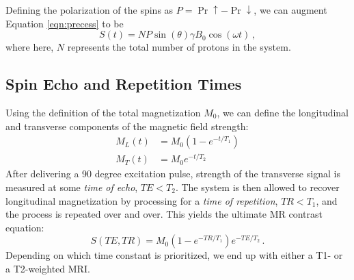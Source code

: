 Defining the polarization of the spins as $P = \Pr{\uparrow} - \Pr{\downarrow}$, we can augment Equation \ref{eqn:precess} to be
\begin{equation}
    S(t) = N P \sin{(\theta)} \gamma B_0\cos(\omega t) \,,
\end{equation}
where here, $N$ represents the total number of protons in the system.

\subsection{Spin Echo and Repetition Times}

Using the definition of the total magnetization $M_0$, we can define the longitudinal and transverse components of the magnetic field strength:
\begin{align}
    M_L(t) &= M_0 (1 - e^{-t / T_1}) \\
    M_T(t) &= M_0 e^{-t / T_2}
\end{align}
After delivering a 90 degree excitation pulse, strength of the transverse signal is measured at some \textit{time of echo}, $TE < T_2$.
The system is then allowed to recover longitudinal magnetization by processing for a \textit{time of repetition}, $TR < T_1$, and the process is repeated over and over.
This yields the ultimate MR contrast equation:
\begin{equation}
    S(TE, TR) = M_0 (1 - e^{- TR / T_1}) e^{- TE / T_2} \,.
\end{equation}
Depending on which time constant is prioritized, we end up with either a T1- or a T2-weighted MRI.